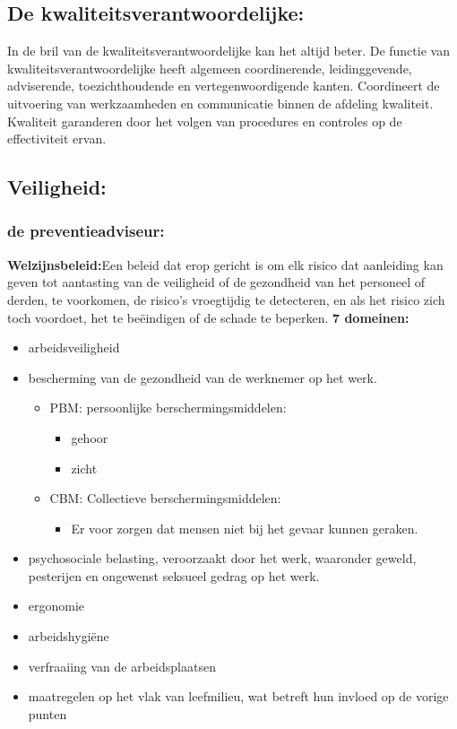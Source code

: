 \documentclass[12pt]{article}
\begin{document}
\subsection{De kwaliteitsverantwoordelijke:}
In de bril van de kwaliteitsverantwoordelijke kan het altijd beter. De functie van kwaliteitsverantwoordelijke heeft algemeen coordinerende, leidinggevende, adviserende, toezichthoudende en vertegenwoordigende kanten. Coordineert de uitvoering van werkzaamheden en communicatie binnen de afdeling kwaliteit.\newline
Kwaliteit garanderen door het volgen van procedures en controles op de effectiviteit
ervan.
\subsection{Veiligheid:}
\subsubsection{de preventieadviseur:}
\textbf{Welzijnsbeleid:}Een beleid dat erop gericht is om elk risico dat aanleiding kan
geven tot aantasting van de veiligheid of de gezondheid van het personeel of
derden, te voorkomen, de risico’s vroegtijdig te detecteren, en als het risico zich
toch voordoet, het te beëindigen of de schade te beperken.\newline
\textbf{7 domeinen:}\begin{itemize}
    \item arbeidsveiligheid
    \item bescherming van de gezondheid van de werknemer op het werk.\begin{itemize}
        \item PBM: persoonlijke berschermingsmiddelen:\begin{itemize}
            \item gehoor 
            \item zicht
        \end{itemize}
        \item CBM: Collectieve berschermingsmiddelen:\begin{itemize}
            \item Er voor zorgen dat mensen niet bij het gevaar kunnen geraken.
        \end{itemize}
    \end{itemize}
    \item psychosociale belasting, veroorzaakt door het werk, waaronder geweld, pesterijen en ongewenst seksueel gedrag op het werk.
    \item ergonomie
    \item arbeidshygiëne
    \item verfraaiing van de arbeidsplaatsen
    \item maatregelen op het vlak van leefmilieu, wat
    betreft hun invloed op de vorige punten
\end{itemize}
\end{document}
